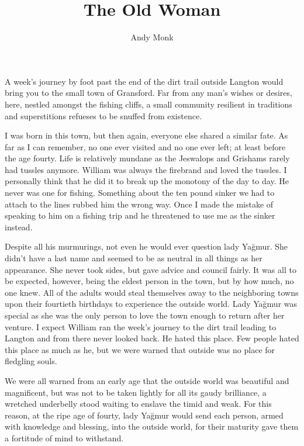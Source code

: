 \documentclass[9pt]{memoir}
\title{The Old Woman}
\author{Andy Monk}
\begin{document}
\clearpage
\maketitle
\thispagestyle{empty}

\mainmatter

A week's journey by foot past the end of the dirt trail outside Langton would bring you to the small town of Gransford. Far from any man's wishes or desires, here, nestled amongst the fishing cliffs, a small community resilient in traditions and superstitions refueses to be snuffed from existence.

I was born in this town, but then again, everyone else shared a similar fate. As far as I can remember, no one ever visited and no one ever left; at least before the age fourty. Life is relatively mundane as the Jeswalops and Grishams rarely had tussles anymore. William was always the firebrand and loved the tussles. I personally think that he did it to break up the monotony of the day to day. He never was one for fishing. Something about the ten pound sinker we had to attach to the lines rubbed him the wrong way. Once I made the mistake of speaking to him on a fishing trip and he threatened to use me as the sinker instead.

Despite all his murmurings, not even he would ever question lady Yağmur. She didn't have a last name and seemed to be as neutral in all things as her appearance. She never took sides, but gave advice and council fairly. It was all to be expected, however, being the eldest person in the town, but by how much, no one knew. All of the adults would steal themselves away to the neighboring towns upon their fourtieth birthdays to experience the outside world. Lady Yağmur was special as she was the only person to love the town enough to return after her venture. I expect William ran the week's journey to the dirt trail leading to Langton and from there never looked back. He hated this place. Few people hated this place as much as he, but we were warned that outside was no place for fledgling souls.

We were all warned from an early age that the outside world was beautiful and magnificent, but was not to be taken lightly for all its gaudy brilliance, a wretched underbelly stood waiting to enslave the timid and weak. For this reason, at the ripe age of fourty, lady Yağmur would send each person, armed with knowledge and blessing, into the outside world, for their maturity gave them a fortitude of mind to withstand.
\end{document}
